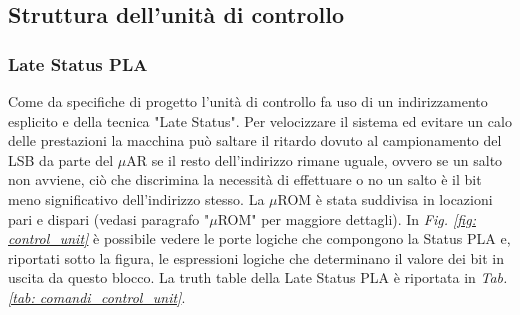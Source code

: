 \subsection{Struttura dell'unità di controllo}

\subsubsection{Late Status PLA}

\noindent Come da specifiche di progetto l'unità di controllo fa uso di un indirizzamento esplicito e della tecnica "Late Status".
Per velocizzare il sistema ed evitare un calo delle prestazioni la macchina può saltare il ritardo dovuto al campionamento del LSB da parte del $\mu$AR
se il resto dell'indirizzo rimane uguale, ovvero se un salto non avviene, ciò che discrimina la necessità di effettuare o no un salto è il bit meno significativo dell'indirizzo stesso.
La $\mu$ROM è stata suddivisa in locazioni pari e dispari (vedasi paragrafo "$\mu$ROM" per maggiore dettagli).
In \textit{Fig. \ref{fig: control_unit}} è possibile vedere le porte logiche che compongono la Status PLA e, riportati sotto la 
figura, le espressioni logiche che determinano il valore dei bit in uscita da questo blocco. La truth table della Late Status PLA è riportata in \textit{Tab. \ref{tab: comandi_control_unit}}.

